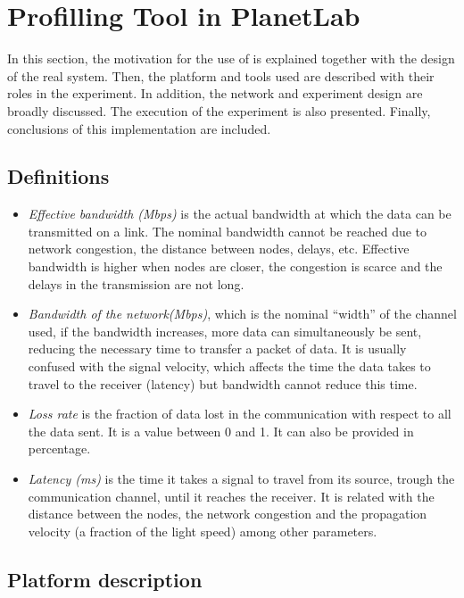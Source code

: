 
\section{Profilling Tool in PlanetLab}
\label{sec:planetlab}
In this section, the motivation for the use of \pl is explained together
with the design of the real system. Then, the platform and tools used are
described with their roles in the experiment. In addition, the network and
experiment design are broadly discussed. The execution of the experiment is also
presented. Finally, conclusions of this implementation are included.


\subsection{Definitions}
\begin{itemize}
\item\emph{Effective bandwidth (Mbps)} is the actual bandwidth at which the data
  can be transmitted on a link. The nominal bandwidth cannot be reached due to
  network congestion, the distance between nodes, delays, etc. Effective bandwidth is higher when nodes are closer, the congestion is scarce and the delays in the transmission are not long.
\item\emph{Bandwidth of the network(Mbps)}, which is the nominal ``width'' of the channel used, if the bandwidth increases, more data can simultaneously be sent, reducing the necessary time to transfer a packet of data. It is usually confused with the signal velocity, which affects the time the data takes to travel to the receiver (latency) but bandwidth cannot reduce this time.
\item\emph{Loss rate} is the fraction of data lost in the communication with respect
to all the data sent. It is a value between 0 and 1. It can also be provided in
percentage.

\item\emph{Latency (ms)} is the time it takes a signal to travel from its source, trough the communication channel, until it reaches the receiver. It is related with the distance between the nodes, the network congestion and the propagation velocity (a fraction of the light speed) among other parameters. 
\end{itemize}

\subsection{Platform description}

